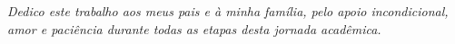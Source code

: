 \begin{dedicatoria}
   \vspace*{\fill}
   \centering
   \noindent
   \textit{ Dedico este trabalho aos meus pais e à minha família, pelo apoio incondicional, amor e paciência durante todas as etapas desta jornada acadêmica.} \vspace*{\fill}
\end{dedicatoria}
